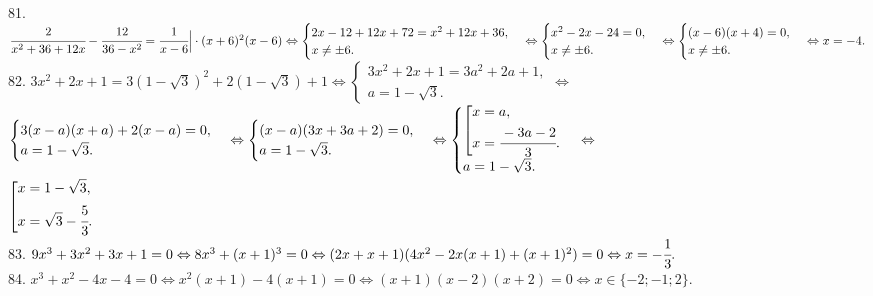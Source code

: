 \documentclass[12pt]{article}
\begin{document}
81. $\cfrac{2}{x^2+36+12x}-\cfrac{12}{36-x^2}=\cfrac{1}{x-6}\Big|\cdot(x+6)^2(x-6)\Leftrightarrow
\begin{cases}2x-12+12x+72=x^2+12x+36,\\ x\neq\pm6.\end{cases}\Leftrightarrow
\begin{cases}x^2-2x-24=0,\\ x\neq\pm6.\end{cases}\Leftrightarrow
\begin{cases}(x-6)(x+4)=0,\\ x\neq\pm6.\end{cases}\Leftrightarrow x=-4.$\\
82. $3x^2+2x+1=3(1-\sqrt{3})^2+2(1-\sqrt{3})+1\Leftrightarrow\begin{cases}3x^2+2x+1=3a^2+2a+1,\\ a=1-\sqrt{3}.\end{cases}
\Leftrightarrow$\\$\begin{cases}3(x-a)(x+a)+2(x-a)=0,\\ a=1-\sqrt{3}.\end{cases}
\Leftrightarrow\begin{cases}(x-a)(3x+3a+2)=0,\\ a=1-\sqrt{3}.\end{cases}
\Leftrightarrow \begin{cases}\left[\begin{gathered}
     x=a,\hfill\\
     x=\cfrac{-3a-2}{3}.\hfill \end{gathered}\right.\\ a=1-\sqrt{3}.\end{cases}\Leftrightarrow$\\$
\left[\begin{gathered}
     x=1-\sqrt{3},\hfill\\
     x=\sqrt{3}-\cfrac{5}{3}.\hfill \end{gathered}\right.$\\
83. $9x^3+3x^2+3x+1=0\Leftrightarrow 8x^3+(x+1)^3=0 \Leftrightarrow (2x+x+1)(4x^2-2x(x+1)+(x+1)^2)=0\Leftrightarrow x=-\cfrac{1}{3}.$\\
84. $x^3+x^2-4x-4=0\Leftrightarrow x^2(x+1)-4(x+1)=0 \Leftrightarrow (x+1)(x-2)(x+2)=0 \Leftrightarrow x\in\{-2;-1;2\}.$\\
\end{document}
